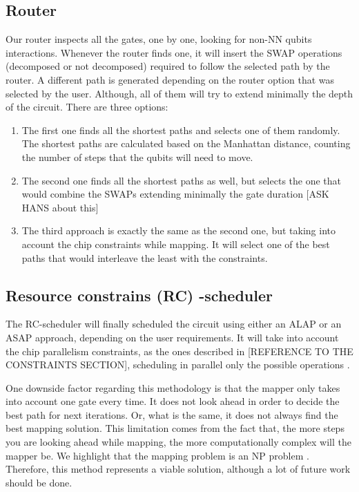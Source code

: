 \subsection{Router}
\label{sec:orga0f3ca5}

Our router inspects all the gates, one by one, looking for non-NN qubits interactions.
Whenever the router finds one, it will insert the SWAP operations (decomposed or not decomposed) required to follow the selected path by the router.
A different path is generated depending on the router option that was selected by the user.
Although, all of them will try to extend minimally the depth of the circuit.
There are three options:

\begin{enumerate}
\item The first one finds all the shortest paths and selects one of them randomly. The shortest paths are calculated based on the Manhattan distance, counting the number of steps that the qubits will need to move.
\item The second one finds all the shortest paths as well, but selects the one that would combine the SWAPs extending minimally the gate duration [ASK HANS about this]
\item The third approach is exactly the same as the second one, but taking into account the chip constraints while mapping. It will select one of the best paths that would interleave the least with the constraints.
\end{enumerate}


\subsection{Resource constrains (RC) -scheduler}
\label{sec:orgfeccc1a}

The RC-scheduler will finally scheduled the circuit using either an ALAP or an ASAP approach, depending on the user requirements.
It will take into account the chip parallelism constraints, as the ones described in [REFERENCE TO THE CONSTRAINTS SECTION], scheduling in parallel only the possible operations
.

One downside factor regarding this methodology is that the mapper only takes into account one gate every time.
It does not look ahead in order to decide the best path for next iterations.
Or, what is the same, it does not always find the best mapping solution.
This limitation comes from the fact that, the more steps you are looking ahead while mapping, the more computationally complex will the mapper be.
We highlight that the mapping problem is an NP problem \cite{Siraichi_2018}.
Therefore, this method represents a viable solution, although a lot of future work should be done.

